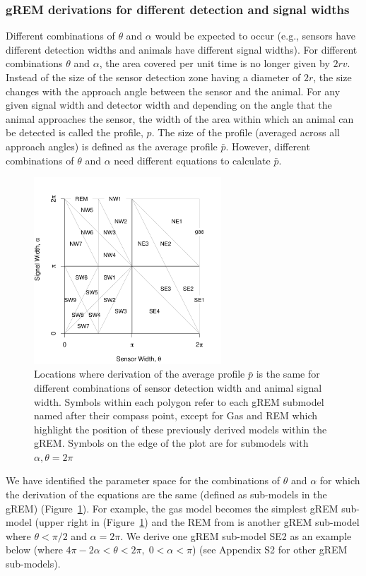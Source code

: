 \documentclass[a4paper,10pt,reqno,oneside]{amsart}
\begin{document}
\subsubsection{gREM derivations for different detection and signal widths}
Different combinations of $\theta$ and $\alpha$ would be expected to occur (e.g., sensors have different detection widths and animals have different signal widths). For different combinations $\theta$ and $\alpha$, the area covered per unit time is no longer given by $2rv$. Instead of the size of the sensor detection zone having a diameter of $2r$, the size changes with the approach angle between the sensor and the animal. For any given signal width and detector width and depending on the angle that the animal approaches the sensor, the width of the area within which an animal can be detected is called the profile, $p$. The size of the profile (averaged across all approach angles) is defined as the average profile $\bar{p}$. However, different combinations of $\theta$ and $\alpha$ need different equations to calculate $\bar{p}$. 

\begin{figure}
\centering
\includegraphics[width=7cm]{imgs/equalRegions.pdf}
\caption{Locations where derivation of the average profile $\bar{p}$ is the same for different combinations of sensor detection width and animal signal width. Symbols within each polygon refer to each gREM submodel named after their compass point, except for Gas and REM which highlight the position of these previously derived models within the gREM. Symbols on the edge of the plot are for submodels with $\alpha, \theta = 2\pi$}
\label{f:equalRegions}
\end{figure}

We have identified the parameter space for the combinations of $\theta$ and $\alpha$ for which the derivation of the equations are the same (defined as sub-models in the gREM) (Figure~\ref{f:equalRegions}). For example, the gas model becomes the simplest gREM sub-model (upper right in (Figure~\ref{f:equalRegions}) and the REM from \citep{rowcliffe2008estimating} is another gREM sub-model where $\theta<\pi/2$ and $\alpha = 2\pi$. We derive one gREM sub-model SE2 as an example below (where $4 \pi - 2 \alpha < \theta < 2\pi ,\; 0 < \alpha <\pi$) (see Appendix S2 for other gREM sub-models).
\end{document}

